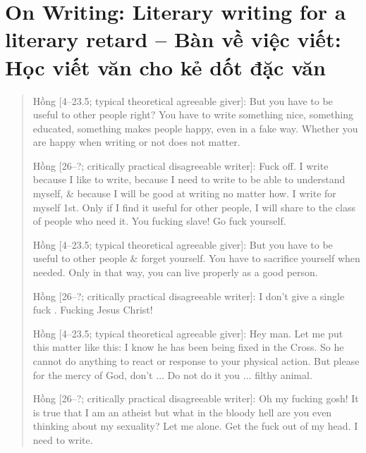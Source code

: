 \documentclass[12pt]{article}
\begin{document}
\section{On Writing: Literary writing for a literary retard -- Bàn về việc viết: Học viết văn cho kẻ dốt đặc văn}

\begin{quotation}
	{\sf Hồng [4--23.5; typical theoretical agreeable giver]}: But you have to be useful to other people right? You have to write something nice, something educated, something makes people happy, even in a fake way. Whether you are happy when writing or not does not matter.
	
	{\sf Hồng [26--?; critically practical disagreeable writer]}: Fuck off. I write because I like to write, because I need to write to be able to understand myself, \& because I will be good at writing no matter how. I write for myself 1st. Only if I find it useful for other people, I will share to the class of people who need it. You fucking slave! Go fuck yourself.
	
	{\sf Hồng [4--23.5; typical theoretical agreeable giver]}: But you have to be useful to other people \& forget yourself. You have to sacrifice yourself when needed. Only in that way, you can live properly as a good person.
	
	{\sf Hồng [26--?; critically practical disagreeable writer]}: I don't give a single fuck \cite{Manson_giving_fuck,Manson_giving_fuck_vn}. Fucking Jesus Christ!
	
	{\sf Hồng [4--23.5; typical theoretical agreeable giver]}: Hey man. Let me put this matter like this: I know he has been being fixed in the Cross. So he cannot do anything to react or response to your physical action. But please for the mercy of God, don't $\ldots$ Do not do it you $\ldots$ filthy animal.
	
	{\sf Hồng [26--?; critically practical disagreeable writer]}: Oh my fucking gosh! It is true that I am an atheist but what in the bloody hell are you even thinking about my sexuality? Let me alone. Get the fuck out of my head. I need to write.
\end{quotation}
\end{document}
